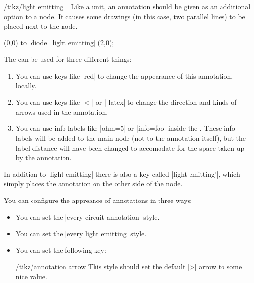 \begin{key}{/tikz/light emitting=}
  Like a unit, an annotation should be given as an additional option
  to a node. It causes some drawings (in this case, two parallel
  lines) to be placed next to the node.

\begin{codeexample}[]
 \draw (0,0) to [diode=light emitting] (2,0);    
\end{codeexample}

  The  can be used for three different things:
  \begin{enumerate}
  \item You can use keys like |red| to change the appearance of this
    annotation, locally.
  \item You can use keys like |<-|  or |-latex| to change the
    direction and kinds of arrows used in the annotation.
  \item You can use info labels like |ohm=5| or |info=foo| inside the
    . These info labels will be added to the main node
    (not to the annotation itself), but the label distance will have
    been changed to accomodate for the space taken up by the
    annotation. 
\begin{codeexample}[]
\end{codeexample}
  \end{enumerate}

  In addition to |light emitting| there is also a key called
  |light emitting'|, which simply places the annotation on the other
  side of the node.

  You can configure the appreance of annotations in three ways:
  \begin{itemize}
  \item You can set the |every circuit annotation| style.
  \item You can set the |every light emitting| style.
  \item You can set the following key:
    \begin{stylekey}{/tikz/annotation arrow}
      This style should set the default |>| arrow to some nice value. 
    \end{stylekey}
  \end{itemize}
\end{key}





